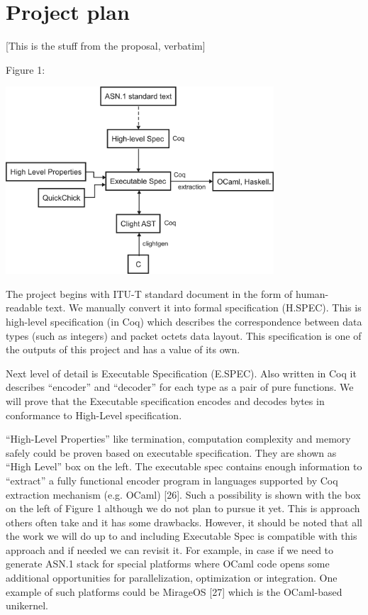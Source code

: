 \documentclass[acmsmall,nonacm]{acmart}
\begin{document}
\section{Project plan}
[This is the stuff from the proposal, verbatim]

Figure 1:

 \includegraphics[width=10cm]{VerificationArchitectureDiagram.png}

The project begins with ITU-T standard document in the form of human-readable text.
We manually convert it into formal specification (H.SPEC). This is high-level specification (in Coq) which describes the correspondence between data types (such as integers) and packet octets data layout. This specification is one of the outputs of this project and has a value of its own.


Next level of detail is Executable Specification (E.SPEC). Also written in Coq it describes ``encoder'' and ``decoder'' for each type as a pair of pure functions. We will prove that the Executable specification encodes and decodes bytes in conformance to High-Level specification.

``High-Level Properties'' like termination, computation complexity and memory safely could be proven based on executable specification. They are shown as ``High Level”  box on the left. The executable spec contains enough information to ``extract” a fully functional encoder program in languages supported by Coq extraction mechanism (e.g. OCaml) [26]. Such a possibility is shown with the box on the left of Figure 1 although we do not plan to pursue it yet. This is approach others often take and it has some drawbacks. However, it should be noted that all the work we will do up to and including Executable Spec is compatible with this approach and if needed we can revisit it. For example, in case if we need to generate ASN.1 stack for special platforms where OCaml code opens some additional opportunities for parallelization, optimization or integration. One example of such platforms could be MirageOS [27]  which is the OCaml-based unikernel.
\end{document}
